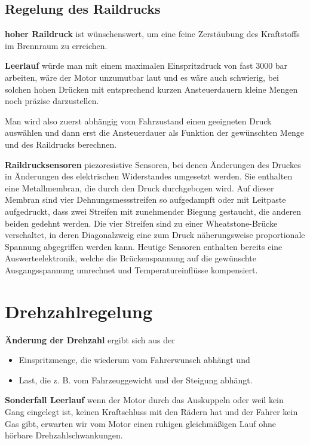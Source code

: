 \newpage

\subsection{Regelung des Raildrucks}\label{regelung-des-raildrucks}

\textbf{hoher Raildruck} ist wünschenswert, um eine feine Zerstäubung
des Kraftstoffs im Brennraum zu erreichen.

\textbf{Leerlauf} würde man mit einem maximalen Einspritzdruck von fast
3000 bar arbeiten, wäre der Motor unzumutbar laut und es wäre auch
schwierig, bei solchen hohen Drücken mit entsprechend kurzen
Ansteuerdauern kleine Mengen noch präzise darzustellen.

Man wird also zuerst abhängig vom Fahrzustand einen geeigneten Druck
auswählen und dann erst die Ansteuerdauer als Funktion der gewünschten
Menge und des Raildrucks berechnen.

\textbf{Raildrucksensoren} piezoresistive Sensoren, bei denen Änderungen
des Druckes in Änderungen des elektrischen Widerstandes umgesetzt
werden. Sie enthalten eine Metallmembran, die durch den Druck
durchgebogen wird. Auf dieser Membran sind vier Dehnungsmessstreifen so
aufgedampft oder mit Leitpaste aufgedruckt, dass zwei Streifen mit
zunehmender Biegung gestaucht, die anderen beiden gedehnt werden. Die
vier Streifen sind zu einer Wheatstone-Brücke verschaltet, in deren
Diagonalzweig eine zum Druck näherungsweise proportionale Spannung
abgegriffen werden kann. Heutige Sensoren enthalten bereits eine
Auswerteelektronik, welche die Brückenspannung auf die gewünschte
Ausgangsspannung umrechnet und Temperatureinflüsse kompensiert.

\newpage

\section{Drehzahlregelung}\label{drehzahlregelung}

\textbf{Änderung der Drehzahl} ergibt sich aus der

\begin{itemize}
\item
  Einspritzmenge, die wiederum vom Fahrerwunsch abhängt und
\item
  Last, die z. B. vom Fahrzeuggewicht und der Steigung abhängt.
\end{itemize}

\textbf{Sonderfall Leerlauf} wenn der Motor durch das Auskuppeln oder
weil kein Gang eingelegt ist, keinen Kraftschluss mit den Rädern hat und
der Fahrer kein Gas gibt, erwarten wir vom Motor einen ruhigen
gleichmäßigen Lauf ohne hörbare Drehzahlschwankungen.

